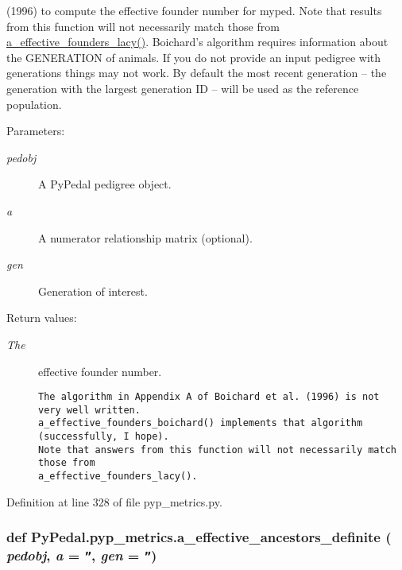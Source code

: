(1996) to compute the effective founder number for myped. Note that results from this function will not necessarily match those from \hyperlink{namespacePyPedal_1_1pyp__metrics_3e7338b4892ff4cdedeb907a08114414}{a\_\-effective\_\-founders\_\-lacy()}. Boichard's algorithm requires information about the GENERATION of animals. If you do not provide an input pedigree with generations things may not work. By default the most recent generation -- the generation with the largest generation ID -- will be used as the reference population. \begin{Desc}
\item[Parameters:]
\begin{description}
\item[{\em pedobj}]A Py\-Pedal pedigree object. \item[{\em a}]A numerator relationship matrix (optional). \item[{\em gen}]Generation of interest. \end{description}
\end{Desc}
\begin{Desc}
\item[Return values:]
\begin{description}
\item[{\em The}]effective founder number.

\footnotesize\begin{verbatim}The algorithm in Appendix A of Boichard et al. (1996) is not very well written.
a_effective_founders_boichard() implements that algorithm (successfully, I hope).
Note that answers from this function will not necessarily match those from
a_effective_founders_lacy().
\end{verbatim}
\normalsize
 \end{description}
\end{Desc}


Definition at line 328 of file pyp\_\-metrics.py.\hypertarget{namespacePyPedal_1_1pyp__metrics_8821be8acfb9095c5f3776906568110b}{
\subsubsection[a\_\-effective\_\-ancestors\_\-definite]{\setlength{\rightskip}{0pt plus 5cm}def Py\-Pedal.pyp\_\-metrics.a\_\-effective\_\-ancestors\_\-definite ( {\em pedobj},  {\em a} = {\tt ''},  {\em gen} = {\tt ''})}}
\label{namespacePyPedal_1_1pyp__metrics_8821be8acfb9095c5f3776906568110b}



